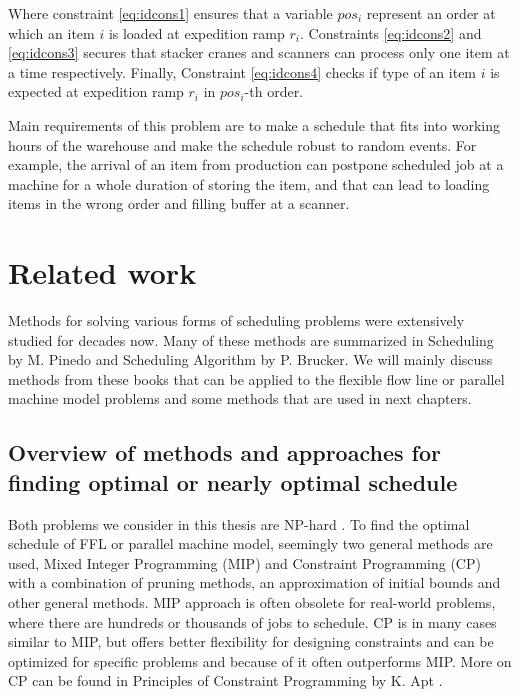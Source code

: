 \documentclass{ctuthesis}
\begin{document}
Where constraint \ref{eq:idcons1} ensures that a variable $pos_i$ represent an order at which an item $i$ is loaded at expedition ramp $r_i$. Constraints \ref{eq:idcons2} and \ref{eq:idcons3} secures that stacker cranes and scanners can process only one item at a time respectively. Finally, Constraint \ref{eq:idcons4} checks if type of an item $i$ is expected at expedition ramp $r_i$ in $pos_i$-th order.

Main requirements of this problem are to make a schedule that fits into working hours of the warehouse and make the schedule robust to random events. For example, the arrival of an item from production can postpone scheduled job at a machine for a whole duration of storing the item, and that can lead to loading items in the wrong order and filling buffer at a scanner. 



\chapter{Related work}
\label{chap:Related work}
Methods for solving various forms of scheduling problems were extensively studied for decades now. Many of these methods are summarized in Scheduling by M. Pinedo \cite{pinedo} and Scheduling Algorithm by P. Brucker\cite{brucker}. We will mainly discuss methods from these books that can be applied to the flexible flow line or parallel machine model problems and some methods that are used in next chapters.

\section{Overview of methods and approaches for finding optimal or nearly optimal schedule}

Both problems we consider in this thesis are NP-hard \cite{pinedo}. To find the optimal schedule of FFL or parallel machine model, seemingly two general methods are used, Mixed Integer Programming (MIP) and Constraint Programming (CP) with a combination of pruning methods, an approximation of initial bounds and other general methods. MIP approach is often obsolete for real-world problems, where there are hundreds or thousands of jobs to schedule. CP is in many cases similar to MIP, but offers better flexibility for designing constraints and can be optimized for specific problems and because of it often outperforms MIP. More on CP can be found in Principles of Constraint Programming by K. Apt \cite{cp}.
\end{document}
